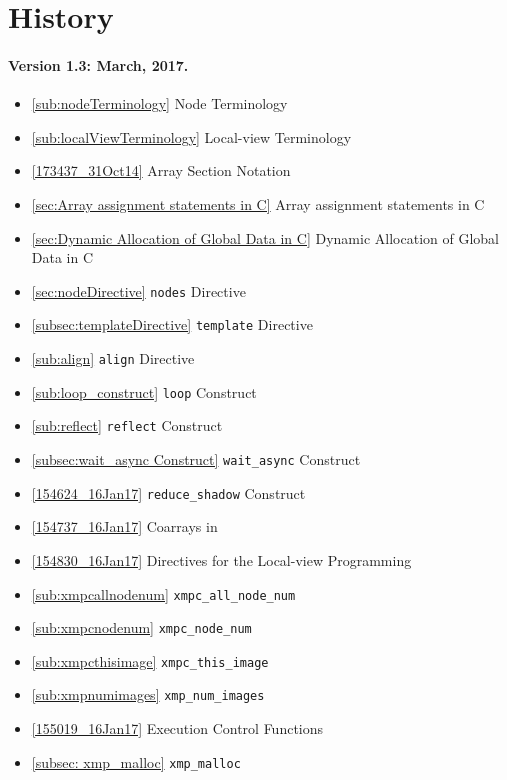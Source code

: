 \section*{History}

\paragraph*{Version 1.3: March, 2017.}

\begin{itemize}
  \item \ref{sub:nodeTerminology}      Node Terminology
  \item \ref{sub:localViewTerminology} Local-view Terminology
  \item \ref{173437_31Oct14}           Array Section Notation
  \item \ref{sec:Array assignment statements in C} Array assignment
		statements in C
  \item \ref{sec:Dynamic Allocation of Global Data in C} Dynamic
		Allocation of Global Data in C
  \item \ref{sec:nodeDirective}        {\tt nodes} Directive
  \item \ref{subsec:templateDirective} {\tt template} Directive
  \item \ref{sub:align}                {\tt align} Directive
  \item \ref{sub:loop_construct}       {\tt loop} Construct
  \item \ref{sub:reflect}              {\tt reflect} Construct
  \item \ref{subsec:wait_async Construct} {\tt wait\_async} Construct
  \item \ref{154624_16Jan17}           {\tt reduce\_shadow} Construct
  \item \ref{154737_16Jan17}           Coarrays in {\XMPC}
  \item \ref{154830_16Jan17}           Directives for the Local-view
		Programming
  \item \ref{sub:xmpcallnodenum}       {\tt xmpc\_all\_node\_num}
  \item \ref{sub:xmpcnodenum}          {\tt xmpc\_node\_num}
  \item \ref{sub:xmpcthisimage}        {\tt xmpc\_this\_image}
  \item \ref{sub:xmpnumimages}         {\tt xmp\_num\_images}
  \item \ref{155019_16Jan17}           Execution Control Functions
  \item \ref{subsec: xmp_malloc}       {\tt xmp\_malloc}

\end{itemize}
